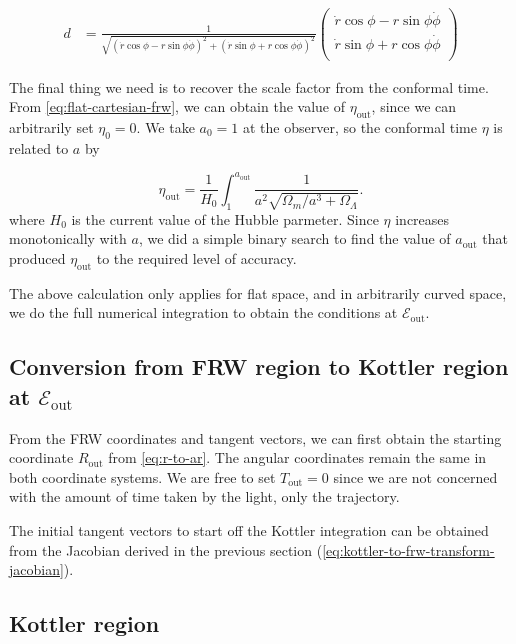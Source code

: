 \begin{align}
    d &= \frac{1}{\sqrt{(\dot{r}\cos\phi - r\sin\phi\dot{\phi})^2 + (\dot{r}\sin\phi + r\cos\phi\dot{\phi})^2}}
          \begin{pmatrix}
           \dot{r}\cos\phi - r\sin\phi\dot{\phi} \\
           \dot{r}\sin\phi + r\cos\phi\dot{\phi} \\
         \end{pmatrix}
\end{align}

The final thing we need is to recover the scale factor from the conformal time. From \autoref{eq:flat-cartesian-frw}, we can obtain the value of $\eta_{\text{out}}$, since we can arbitrarily set $\eta_0 = 0$. We take $a_0 = 1$ at the observer, so the conformal time $\eta$ is related to $a$ by

\begin{equation}
  \eta_{\text{out}} = \frac{1}{H_0} \int_1^{a_{\text{out}}} \frac{1}{a^2 \sqrt{\Omega_m/a^3 + \Omega_{\Lambda}}}.
  \label{eq:conformal-time-eta-to-a-integral}
\end{equation}
where $H_0$ is the current value of the Hubble parmeter. Since $\eta$ increases monotonically with $a$, we did a simple binary search to find the value of $a_{\text{out}}$ that produced $\eta_{\text{out}}$ to the required level of accuracy. 

The above calculation only applies for flat space, and in arbitrarily curved space, we do the full numerical integration to obtain the conditions at $\mathcal{E}_{\text{out}}$.

\subsection{Conversion from FRW region to Kottler region at $\mathcal{E}_{\text{out}}$}
\label{subsec:frw-to-kottler}

From the FRW coordinates and tangent vectors, we can first obtain the starting coordinate $R_{\text{out}}$ from \autoref{eq:r-to-ar}. The angular coordinates remain the same in both coordinate systems. We are free to set $T_{\text{out}} = 0$ since we are not concerned with the amount of time taken by the light, only the trajectory. 

The initial tangent vectors to start off the Kottler integration can be obtained from the Jacobian derived in the previous section (\autoref{eq:kottler-to-frw-transform-jacobian}).

\subsection{Kottler region}

